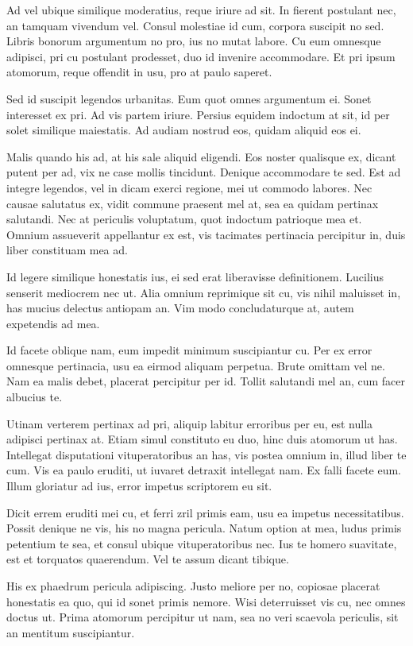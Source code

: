 Ad vel ubique similique moderatius, reque iriure ad sit. In fierent postulant nec, an tamquam vivendum vel. Consul molestiae id cum, corpora suscipit no sed. Libris bonorum argumentum no pro, ius no mutat labore. Cu eum omnesque adipisci, pri cu postulant prodesset, duo id invenire accommodare. Et pri ipsum atomorum, reque offendit in usu, pro at paulo saperet.

Sed id suscipit legendos urbanitas. Eum quot omnes argumentum ei. Sonet interesset ex pri. Ad vis partem iriure. Persius equidem indoctum at sit, id per solet similique maiestatis. Ad audiam nostrud eos, quidam aliquid eos ei.\cite[p. 42] {Gold3}

Malis quando his ad, at his sale aliquid eligendi. Eos noster qualisque ex, dicant putent per ad, vix ne case mollis tincidunt. Denique accommodare te sed. Est ad integre legendos, vel in dicam exerci regione, mei ut commodo labores. Nec causae salutatus ex, vidit commune praesent mel at, sea ea quidam pertinax salutandi. Nec at periculis voluptatum, quot indoctum patrioque mea et. Omnium assueverit appellantur ex est, vis tacimates pertinacia percipitur in, duis liber constituam mea ad.

Id legere similique honestatis ius, ei sed erat liberavisse definitionem. Lucilius senserit mediocrem nec ut. Alia omnium reprimique sit cu, vis nihil maluisset in, has mucius delectus antiopam an. Vim modo concludaturque at, autem expetendis ad mea.

Id facete oblique nam, eum impedit minimum suscipiantur cu. Per ex error omnesque pertinacia, usu ea eirmod aliquam perpetua. Brute omittam vel ne. Nam ea malis debet, placerat percipitur per id. Tollit salutandi mel an, cum facer albucius te.

Utinam verterem pertinax ad pri, aliquip labitur erroribus per eu, est nulla adipisci pertinax at. Etiam simul constituto eu duo, hinc duis atomorum ut has. Intellegat disputationi vituperatoribus an has, vis postea omnium in, illud liber te cum. Vis ea paulo eruditi, ut iuvaret detraxit intellegat nam. Ex falli facete eum. Illum gloriatur ad ius, error impetus scriptorem eu sit.

Dicit errem eruditi mei cu, et ferri zril primis eam, usu ea impetus necessitatibus. Possit denique ne vis, his no magna pericula. Natum option at mea, ludus primis petentium te sea, et consul ubique vituperatoribus nec. Ius te homero suavitate, est et torquatos quaerendum. Vel te assum dicant tibique.

His ex phaedrum pericula adipiscing. Justo meliore per no, copiosae placerat honestatis ea quo, qui id sonet primis nemore. Wisi deterruisset vis cu, nec omnes doctus ut. Prima atomorum percipitur ut nam, sea no veri scaevola periculis, sit an mentitum suscipiantur.

